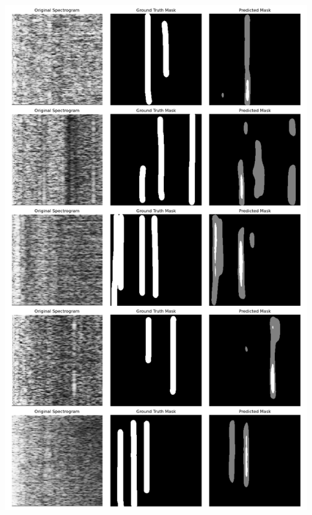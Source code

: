 \documentclass[]{beamer}
\begin{document}
\begin{frame}[plain]{}
    \centering
    \includegraphics[clip,trim={0 10.5cm 0 10.2cm},height=0.9\paperheight]{img/unet_segmentation_500_epochs.png}
\end{frame}
\end{document}
